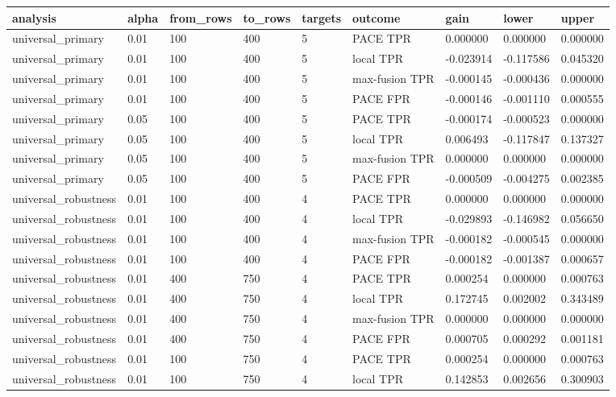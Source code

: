 \begin{tabular}{lllllllll}
\toprule
analysis & alpha & from\_rows & to\_rows & targets & outcome & gain & lower & upper \\
\midrule
universal\_primary & 0.01 & 100 & 400 & 5 & PACE TPR & 0.000000 & 0.000000 & 0.000000 \\
universal\_primary & 0.01 & 100 & 400 & 5 & local TPR & -0.023914 & -0.117586 & 0.045320 \\
universal\_primary & 0.01 & 100 & 400 & 5 & max-fusion TPR & -0.000145 & -0.000436 & 0.000000 \\
universal\_primary & 0.01 & 100 & 400 & 5 & PACE FPR & -0.000146 & -0.001110 & 0.000555 \\
universal\_primary & 0.05 & 100 & 400 & 5 & PACE TPR & -0.000174 & -0.000523 & 0.000000 \\
universal\_primary & 0.05 & 100 & 400 & 5 & local TPR & 0.006493 & -0.117847 & 0.137327 \\
universal\_primary & 0.05 & 100 & 400 & 5 & max-fusion TPR & 0.000000 & 0.000000 & 0.000000 \\
universal\_primary & 0.05 & 100 & 400 & 5 & PACE FPR & -0.000509 & -0.004275 & 0.002385 \\
universal\_robustness & 0.01 & 100 & 400 & 4 & PACE TPR & 0.000000 & 0.000000 & 0.000000 \\
universal\_robustness & 0.01 & 100 & 400 & 4 & local TPR & -0.029893 & -0.146982 & 0.056650 \\
universal\_robustness & 0.01 & 100 & 400 & 4 & max-fusion TPR & -0.000182 & -0.000545 & 0.000000 \\
universal\_robustness & 0.01 & 100 & 400 & 4 & PACE FPR & -0.000182 & -0.001387 & 0.000657 \\
universal\_robustness & 0.01 & 400 & 750 & 4 & PACE TPR & 0.000254 & 0.000000 & 0.000763 \\
universal\_robustness & 0.01 & 400 & 750 & 4 & local TPR & 0.172745 & 0.002002 & 0.343489 \\
universal\_robustness & 0.01 & 400 & 750 & 4 & max-fusion TPR & 0.000000 & 0.000000 & 0.000000 \\
universal\_robustness & 0.01 & 400 & 750 & 4 & PACE FPR & 0.000705 & 0.000292 & 0.001181 \\
universal\_robustness & 0.01 & 100 & 750 & 4 & PACE TPR & 0.000254 & 0.000000 & 0.000763 \\
universal\_robustness & 0.01 & 100 & 750 & 4 & local TPR & 0.142853 & 0.002656 & 0.300903 \\

\end{tabular}
